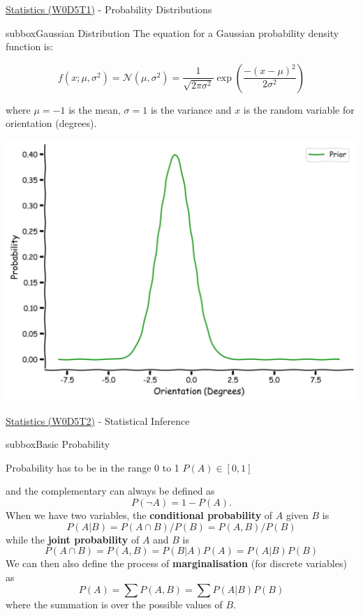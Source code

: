 \begin{multicols}{3}
\begin{textbox}{\href{https://compneuro.neuromatch.io/tutorials/W0D5_Statistics/student/W0D5_Tutorial1.html}{Statistics (W0D5T1)} - Probability Distributions}
\begin{subbox}{subbox}{Gaussian Distribution}
The equation for a Gaussian probability density function is:

\begin{equation}
f(x;\mu,\sigma^2) = \mathcal{N}(\mu,\sigma^2) = \frac{1}{\sqrt{2\pi\sigma^2}}\exp\left(\frac{-(x-\mu)^2}{2\sigma^2}\right)
\end{equation}

where $\mu=-1$ is the mean, $\sigma=1$ is the variance and $x$ is the random variable for orientation (degrees). 


\centering
\includegraphics[scale=0.1]{Figures/PreCourse/SFigure2.png}

\end{subbox}
\end{textbox}
\begin{textbox}{\href{https://compneuro.neuromatch.io/tutorials/W0D5_Statistics/student/W0D5_Tutorial2.html}{Statistics (W0D5T2)} - Statistical Inference}
\begin{subbox}{subbox}{Basic Probability}
\scriptsize

Probability has to be in the range 0 to 1
$P(A) \in  [0,1] $

and the complementary can always be defined as
$$P(\neg A) = 1-P(A).$$
When we have two variables, the \textbf{conditional probability} of $A$ given $B$ is 
$$P (A|B) = P (A \cap B)/P (B)=P (A, B)/P (B)$$
while the \textbf{joint probability} of $A$ and $B$ is
$$P(A \cap B)=P(A,B) = P(B|A)P(A) = P(A|B)P(B) $$
We can then also define the process of \textbf{marginalisation} (for discrete variables) as 
$$P(A)=\sum P(A,B)=\sum P(A|B)P(B)$$ 
where the summation is over the possible values of $B$.


\end{subbox}
\end{textbox}
\end{multicols}
